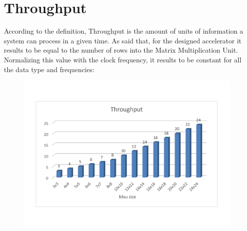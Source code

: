 \newpage
\section{Throughput}
According to the definition, Throughput is the amount of units of information a system can process in a given time. As said that, for the designed accelerator it results to be equal to the number of rows into the Matrix Multiplication Unit. Normalizing this value with the clock frequency, it results to be constant for all the data type and frequencies:
\begin{figure}[!htbp]
\centering
\captionsetup{justification=centering}
\includegraphics[scale=0.5,angle=0]{./figure/graphs/throughput.pdf}
\label{fig:tp8bit}
\end{figure}

